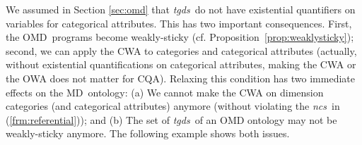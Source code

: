 \documentclass[format=acmsmall, review=false, screen=true]{acmart}
\newcommand{\ignore}[1]{}
\newcommand{\dpm}{{Datalog}$^\pm$}
\newcommand{\omd}{OMD}
\newcommand{\cwa}{CWA}
\newcommand{\md}{MD}
\newcommand{\tgds}{{\em tgds}}
\newcommand{\ncs}{{\em ncs}}
\begin{document}
We assumed in Section \ref{sec:omd} that \tgds \ do not have existential quantifiers on variables for categorical attributes. This has two important consequences. First, the \omd \ programs become weakly-sticky (cf. Proposition~\ref{prop:weaklysticky}); second, we can apply the CWA to categories and categorical attributes (actually, without existential quantifications on categorical attributes, making the CWA or the OWA does not matter for CQA).
Relaxing this condition has two immediate effects on the \md \ ontology: (a) We cannot make the CWA on dimension categories (and categorical attributes) anymore (without violating the \ncs \ in (\ref{frm:referential})); and (b) The set of \tgds \ of an OMD ontology may not be weakly-sticky anymore. The following example shows both issues.



\ignore{
\cwa \ would not hold for the underlying \md \ database since: According to the semantics of \dpm, new values could appear in the positions of categorical values. (b) The dimensional rules would not necessarily be weakly-sticky (Proposition~\ref{prop:weaklysticky} would be falsified). These are shown in the following example.}
\end{document}
